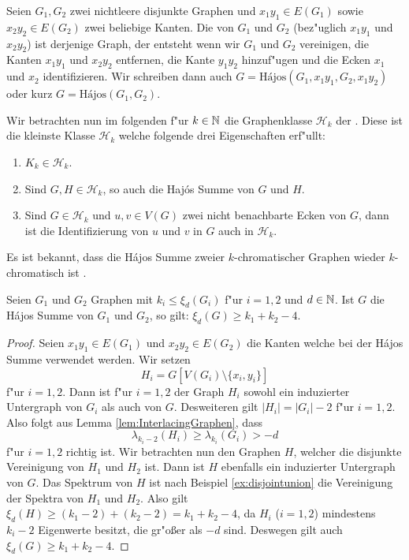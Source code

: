   Seien $G_1, G_2$ zwei nichtleere disjunkte Graphen und $x_1y_1\in E(G_1)$ sowie $x_2y_2 \in E(G_2)$ zwei beliebige Kanten. Die  \cite{Hajos61} von $G_1$ und $G_2$ (bez"uglich $x_1y_1$ und $x_2y_2$) ist derjenige Graph, der entsteht wenn wir $G_1$ und $G_2$ vereinigen, die Kanten $x_1y_1$ und $x_2y_2$ entfernen, die Kante $y_1y_2$ hinzuf"ugen und  die Ecken $x_1$ und $x_2$ identifizieren. Wir schreiben dann auch $G= \text{H\'ajos}(G_1,x_1y_1,G_2,x_1y_2)$ oder
  kurz $G= \text{H\'ajos}(G_1,G_2)$.

  Wir betrachten nun im folgenden f"ur $k\in {\mathbb{N}}$ die Graphenklasse $\mathcal{H}_k$ der . Diese ist die kleinste Klasse $\mathcal{H}_k$ welche folgende drei Eigenschaften erf"ullt:
  \begin{enumerate}[label=\rm{(\alph*)}]
    \item $K_k\in \mathcal{H}_k$.
    \item Sind $G, H \in \mathcal{H}_k$, so auch die Haj\'os Summe von $G$ und $H$.
    \item Sind $G\in \mathcal{H}_k$ und $u,v\in V(G)$ zwei nicht benachbarte Ecken von $G$, dann ist die Identifizierung von $u$ und $v$ in $G$ auch in $\mathcal{H}_k$.
  \end{enumerate}

  Es ist bekannt, dass die H\'ajos Summe zweier $k$-chromatischer Graphen wieder $k$-chromatisch ist . 

  \begin{theorem}
    Seien $G_1$ und $G_2$ Graphen mit $k_i\leq \xi_{d}(G_i)$ f"ur $i=1,2$ und $d\in{\mathbb{N}}$. 
    Ist $G$ die H\'ajos Summe von $G_1$ und $G_2$, so gilt:
    $\xi_{d}(G) \geq k_1+k_2-4$.
    \label{thm:hajoseigenwerte}
  \end{theorem}

  \begin{proof}
    Seien $x_1y_1\in E(G_1)$ und $x_2y_2\in E(G_2)$ die Kanten welche bei der H\'ajos Summe verwendet werden. Wir setzen $$H_i = G[V(G_i)\setminus\{x_i,y_i\}] $$ f"ur $i=1,2$. Dann ist f"ur $i=1,2$ der Graph $H_i$ sowohl ein induzierter Untergraph von $G_i$ als auch von $G$. 
    Desweiteren gilt $|H_i| = |G_i|-2$ f"ur $i=1,2$. Also folgt aus Lemma \ref{lem:InterlacingGraphen}, dass $$\lambda_{k_i-2}(H_i) \geq \lambda_{k_i}(G_i) > -d$$ f"ur $i=1,2$ richtig ist. Wir betrachten nun den Graphen $H$, welcher die disjunkte Vereinigung von $H_1$ und $H_2$ ist. Dann ist $H$ ebenfalls ein induzierter Untergraph von $G$. 
    Das Spektrum von $H$ ist nach Beispiel \ref{ex:disjointunion} die Vereinigung der Spektra von $H_1$ und $H_2$. Also gilt $\xi_{d}(H) \geq (k_1-2)+ (k_2-2) = k_1+k_2-4$, da $H_i$ ($i=1,2$) mindestens $k_i -2$ Eigenwerte besitzt, die gr"o{\ss}er als $-d$ sind.
    Deswegen gilt auch $\xi_{d}(G) \geq k_1+k_2-4$.
  \end{proof}

